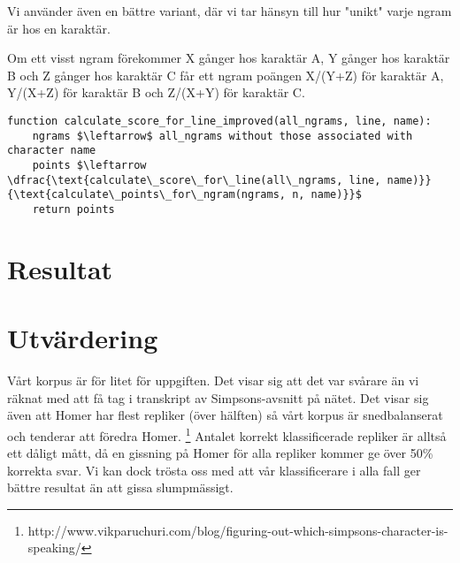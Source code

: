\documentclass[a4paper]{article}
\begin{document}
Vi använder även en bättre variant, där vi tar hänsyn till hur "unikt" varje ngram är hos en karaktär.

Om ett visst ngram förekommer X gånger hos karaktär A, Y gånger hos karaktär B och Z gånger hos karaktär C
får ett ngram poängen X/(Y+Z) för karaktär A, Y/(X+Z) för karaktär B och Z/(X+Y) för karaktär C.

\begin{lstlisting}[mathescape, columns=fullflexible, basicstyle=\fontfamily{lmvtt}\selectfont]
function calculate_score_for_line_improved(all_ngrams, line, name):
    ngrams $\leftarrow$ all_ngrams without those associated with character name 
    points $\leftarrow  \dfrac{\text{calculate\_score\_for\_line(all\_ngrams, line, name)}}{\text{calculate\_points\_for\_ngram(ngrams, n, name)}}$
    return points
\end{lstlisting}

\section{Resultat}


\section{Utvärdering}

Vårt korpus är för litet för uppgiften.
Det visar sig att det var svårare än vi räknat med att få tag i transkript av Simpsons-avsnitt på nätet.
Det visar sig även att Homer har flest repliker (över hälften) så vårt korpus är snedbalanserat och tenderar att föredra Homer.
\footnote{http://www.vikparuchuri.com/blog/figuring-out-which-simpsons-character-is-speaking/}
Antalet korrekt klassificerade repliker är alltså ett dåligt mått, då en gissning på Homer för alla repliker kommer ge över 50\% korrekta svar. Vi kan dock trösta oss med att vår klassificerare i alla fall ger bättre resultat än att gissa slumpmässigt. 

\end{document}
